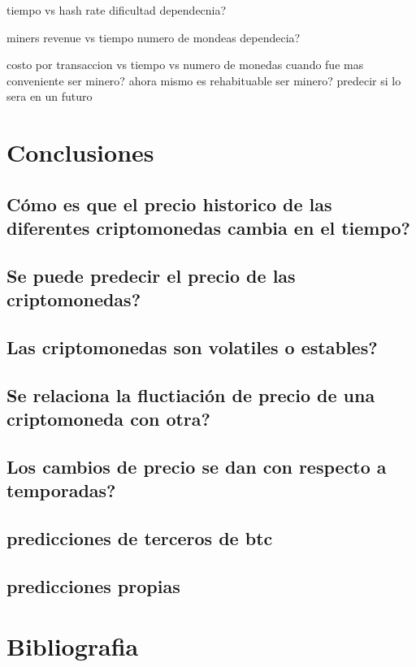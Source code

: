 \documentclass[12pt,letterpaper]{article}
\begin{document}
    tiempo vs hash rate
        dificultad
            dependecnia?

    miners revenue vs tiempo
        numero de mondeas
         dependecia?

    costo por transaccion vs tiempo
        vs numero de monedas
            cuando fue mas conveniente ser minero?
            ahora mismo es rehabituable ser minero?
                predecir si lo sera en un futuro

\section*{Conclusiones}

	\subsection*{C\'omo es que el precio historico de las diferentes criptomonedas cambia en el tiempo?}
	\subsection*{Se puede predecir el precio de las criptomonedas?}
	\subsection*{Las criptomonedas son volatiles o estables?}
	\subsection*{Se relaciona la fluctiaci\'on de precio de una criptomoneda con otra?}
	\subsection*{Los cambios de precio se dan con respecto a temporadas?}
	\subsection*{predicciones de terceros de btc}
	\subsection*{predicciones propias}
	
\section{Bibliografia}
\end{document}
